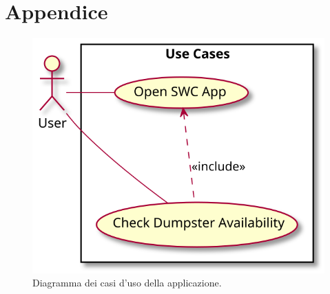 \section{Appendice}
\label{sec:appendix}

\begin{figure}[H]
    \centering
    \includegraphics[width=\textwidth]{uml/app-use-case.pm.svg}
    \caption{Diagramma dei casi d'uso della applicazione.}
    \label{fig:app-use-case}
\end{figure}

